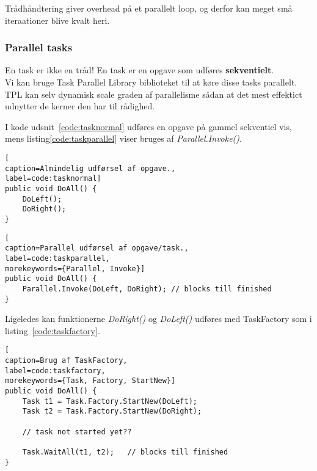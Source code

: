Trådhåndtering giver overhead på et parallelt loop, og derfor kan meget små iteraationer blive kvalt heri.



\subsubsection{Parallel tasks}

En task er ikke en tråd! En task er en opgave som udføres \textbf{sekventielt}.\\

Vi kan bruge Task Parallel Library biblioteket til at køre disse tasks parallelt. TPL kan selv dynamisk scale graden af parallelisme sådan at det mest effektict udnytter de kerner den har til rådighed.

I kode udsnit~\ref{code:tasknormal} udføres en opgave på gammel sekventiel vis, mens listing\ref{code:taskparallel} viser bruges af \textit{Parallel.Invoke()}.

\begin{lstlisting}[
caption=Almindelig udførsel af opgave.,
label=code:tasknormal]
public void DoAll() {
	DoLeft();
	DoRight();
}
\end{lstlisting}

\begin{lstlisting}[
caption=Parallel udførsel af opgave/task.,
label=code:taskparallel,
morekeywords={Parallel, Invoke}]
public void DoAll() {
	Parallel.Invoke(DoLeft, DoRight); // blocks till finished
}
\end{lstlisting}

Ligeledes kan funktionerne \textit{DoRight()} og \textit{DoLeft()} udføres med TaskFactory som i listing~\ref{code:taskfactory}.

\begin{minipage}{\linewidth}
\begin{lstlisting}[
caption=Brug af TaskFactory,
label=code:taskfactory,
morekeywords={Task, Factory, StartNew}]
public void DoAll() {
	Task t1 = Task.Factory.StartNew(DoLeft);
	Task t2 = Task.Factory.StartNew(DoRight);
	
	// task not started yet??
	
	Task.WaitAll(t1, t2);	// blocks till finished
}
\end{lstlisting}
\end{minipage}

